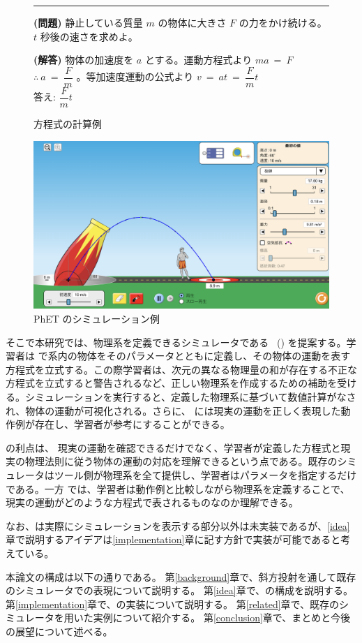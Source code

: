 \begin{figure}[htb]
\noindent\rule{\linewidth}{0.4pt}

\small{\textbf{(問題)} 静止している質量 $m$ の物体に大きさ $F$ の力をかけ続ける。$t$ 秒後の速さを求めよ。}

\small{\textbf{(解答)} 物体の加速度を $a$ とする。運動方程式より $ma~=~F$ $\therefore~a~=~\dfrac{F}{m}$ 。等加速度運動の公式より $v~=~at~=~\dfrac{F}{m}t$\\
答え: $\dfrac{F}{m}t$}

\caption{方程式の計算例} \label{symbol_based}
\end{figure}

\begin{figure}[htb]
\centering
\includegraphics*[width=0.9\linewidth]{figure/PhET_example.png}
\caption{PhET のシミュレーション例} \label{numeral_based}
\end{figure}

そこで本研究では、物理系を定義できるシミュレータである \simname~(\simnamealt) を提案する。学習者は \simname で系内の物体をそのパラメータとともに定義し、その物体の運動を表す方程式を立式する。この際学習者は、次元の異なる物理量の和が存在する不正な方程式を立式すると警告されるなど、正しい物理系を作成するための補助を受ける。シミュレーションを実行すると、定義した物理系に基づいて数値計算がなされ、物体の運動が可視化される。さらに、 \simname には現実の運動を正しく表現した動作例が存在し、学習者が参考にすることができる。

\simname の利点は、
現実の運動を確認できるだけでなく、学習者が定義した方程式と現実の物理法則に従う物体の運動の対応を理解できるという点である。既存のシミュレータはツール側が物理系を全て提供し、学習者はパラメータを指定するだけである。一方 \simname では、学習者は動作例と比較しながら物理系を定義することで、現実の運動がどのような方程式で表されるものなのか理解できる。

なお、\simname は実際にシミュレーションを表示する部分以外は未実装であるが、\ref{idea}章で説明するアイデアは\ref{implementation}章に記す方針で実装が可能であると考えている。

本論文の構成は以下の通りである。
第\ref{background}章で、斜方投射を通して既存のシミュレータでの表現について説明する。
第\ref{idea}章で、\simname の構成を説明する。
第\ref{implementation}章で、\simname の実装について説明する。
第\ref{related}章で、既存のシミュレータを用いた実例について紹介する。
第\ref{conclusion}章で、まとめと今後の展望について述べる。
